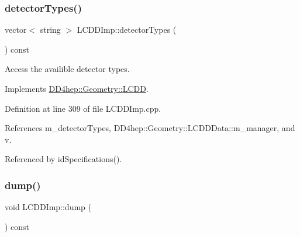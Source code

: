 \hypertarget{class_d_d4hep_1_1_geometry_1_1_l_c_d_d_imp_a9ee7513efc234c9158b19cdffb642a6b}{}\label{class_d_d4hep_1_1_geometry_1_1_l_c_d_d_imp_a9ee7513efc234c9158b19cdffb642a6b} 
\subsubsection{\texorpdfstring{detector\+Types()}{detectorTypes()}}
{\footnotesize\ttfamily vector$<$ string $>$ L\+C\+D\+D\+Imp\+::detector\+Types (\begin{DoxyParamCaption}{ }\end{DoxyParamCaption}) const\hspace{0.3cm}{\ttfamily [virtual]}}



Access the availible detector types. 



Implements \hyperlink{class_d_d4hep_1_1_geometry_1_1_l_c_d_d_a196cc776b69db52d89f3396bf03d224f}{D\+D4hep\+::\+Geometry\+::\+L\+C\+DD}.



Definition at line 309 of file L\+C\+D\+D\+Imp.\+cpp.



References m\+\_\+detector\+Types, D\+D4hep\+::\+Geometry\+::\+L\+C\+D\+D\+Data\+::m\+\_\+manager, and v.



Referenced by id\+Specifications().

\hypertarget{class_d_d4hep_1_1_geometry_1_1_l_c_d_d_imp_a0194b8c2b0af774894f606ed48e205db}{}\label{class_d_d4hep_1_1_geometry_1_1_l_c_d_d_imp_a0194b8c2b0af774894f606ed48e205db} 
\subsubsection{\texorpdfstring{dump()}{dump()}}
{\footnotesize\ttfamily void L\+C\+D\+D\+Imp\+::dump (\begin{DoxyParamCaption}{ }\end{DoxyParamCaption}) const\hspace{0.3cm}{\ttfamily [virtual]}}



